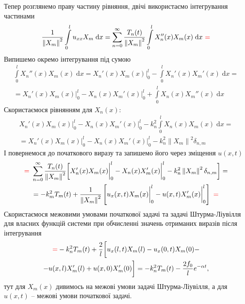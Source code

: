 Тепер розглянемо праву частину рівняння, двічі використаємо інтегрування частинами
\begin{equation*}
    \frac{1}{\left\lVert X_m\right\rVert^2} \int\limits_0^l u_{xx} X_m \;\mathrm{d}x = \sum\limits_{n=0}^\infty \frac{T_n(t)}{\left\lVert X_m\right\rVert^2} \int\limits_0^l X_n''(x) X_m(x) \;\mathrm{d}x \  \textcolor{red}{=}
\end{equation*}
Випишемо окремо інтегрування під сумою
\begin{equation*}
    \begin{gathered}
        \int\limits_0^l X_n''(x) X_m(x) \;\mathrm{d}x = X_n'(x) X_m(x) \bigg|_0^l - \int\limits_0^l X_n'(x) X_m'(x) \;\mathrm{d}x = \\
        = X_n'(x) X_m(x) \bigg|_0^l - X_n(x) X_m'(x) \bigg|_0^l + \int\limits_0^l X_n(x) X_m''(x) \;\mathrm{d}x
    \end{gathered}
\end{equation*}
Скористаємося рівнянням для $X_n(x)$:
\begin{equation*}
    \begin{gathered}
        X_n'(x) X_m(x) \bigg|_0^l - X_n(x) X_m'(x) \bigg|_0^l - k_n^2 \int\limits_0^l X_n(x) X_m(x) \;\mathrm{d}x =\\
        = X_n'(x) X_m(x) \bigg|_0^l - X_n(x) X_m'(x) \bigg|_0^l - k_n^2 \left\lVert X_m\right\rVert^2 \delta_{n,m}
    \end{gathered}
\end{equation*}
І повернемося до початкового виразу та запишемо його через зміщення $u(x,t)$
\begin{equation*}
    \begin{gathered}
        \textcolor{red}{=}\ \sum\limits_{n=0}^\infty \frac{T_n(t)}{\left\lVert X_m\right\rVert^2} \bigg[X_n'(x) X_m(x) \bigg|_0^l - X_n(x) X_m'(x) \bigg|_0^l - k_n^2 \left\lVert X_m\right\rVert^2 \delta_{n,m}\bigg] =\\
        = - k_m^2 T_m(t) + \frac{1}{\left\lVert X_m\right\rVert^2} \left[ u_x(x,t) X_m(x) \bigg|_0^l - u(x,t) X_m'(x) \bigg|_0^l \right] \ \textcolor{red}{=}
    \end{gathered}
\end{equation*}
Скористаємося межовими умовами початкової задачі та задачі Штурма-Ліувілля для власних функцій системи при обчисленні значень отриманих виразів після інтегрування
\begin{equation*}
    \begin{gathered}
        \textcolor{red}{= } -k_n^2 T_m(t) + \frac{2}{l} \bigg[ u_x(l,t) X_m(l) - u_x(0,t) X_m(0) -\\
        - u(x,l) X_m'(l) + u(x,0) X_m'(0) \bigg] = - k_n^2 T_m(t) - \frac{2 f_0}{l} e^{-\alpha t},
    \end{gathered}
\end{equation*}
тут для $X_m(x)$ дивимось на межові умови задачі Штурма-Ліувілля, а для $u(x,t)$ -- межові умови початкової задачі.


